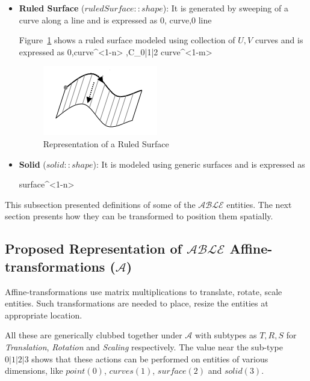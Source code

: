 \begin{itemize}[noitemsep,topsep=2pt,parsep=2pt,partopsep=2pt]
\item {\bf Ruled Surface} ($ruledSurface::shape$): It is generated by sweeping of a curve along a line and is expressed as  {0, curve,0} {line}

Figure~\ref{fig:abstraction:hodasurface} shows a ruled surface modeled using collection of $U,V$ curves and is expressed as  {0,curve{^{<1-n>} },C_{0|1|2}} {curve{^{<1-m>} }}   

\smallskip

\begin{figure}[!h]
\centering 
\includegraphics[width=0.35\linewidth]{../Common/images/hodasurface} 
\caption{Representation of a Ruled Surface}
\label{fig:abstraction:hodasurface}
\end{figure}

\smallskip

\item {\bf Solid} ($solid::shape$): It is modeled using generic surfaces and is expressed as 

 {surface{^{<1-n>} }}

\end{itemize}

This subsection presented definitions of some of the $\mathcal{ABLE}$ entities. The next section presents how they can be transformed to position them spatially.


\subsection{Proposed Representation of $\mathcal{ABLE}$ Affine-transformations ($\mathcal{A}$)}

Affine-transformations use matrix multiplications to translate, rotate, scale entities. Such transformations are needed to place, resize the entities at appropriate location. 

All these are generically clubbed together under {\bf $\mathcal{A}$} with subtypes as $T,R,S$ for {\em Translation}, {\em Rotation} and {\em Scaling} respectively. The value near the sub-type ${0|1|2|3 }$ shows that these actions can be performed on entities of various dimensions, like $point (0)$, $curves(1)$, $surface(2)$ and $solid(3)$. 


